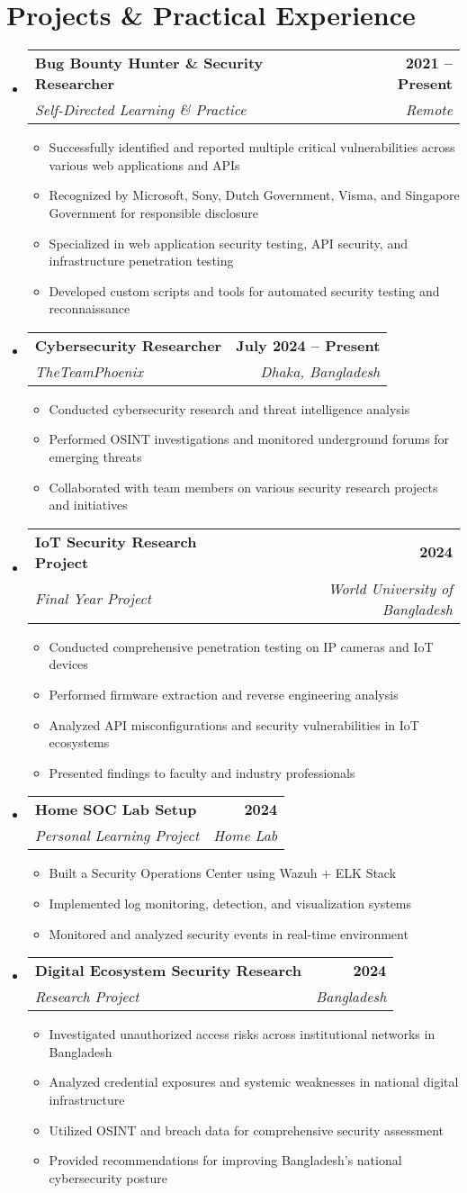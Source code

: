 \documentclass[11pt,a4paper]{article}
\makeatletter
\newcommand{\resumeitem}[1]{\item\small{#1}}
\newcommand{\resumesubheading}[4]{
  \vspace{-1pt}\item
    \begin{tabular*}{0.97\textwidth}[t]{l@{\extracolsep{\fill}}r}
      \textbf{#1} & \textbf{\small #2} \\
      \textit{\small#3} & \textit{\small #4} \\
    \end{tabular*}\vspace{-5pt}
}
\newcommand{\resumesubheadingliststart}{\begin{itemize}[leftmargin=0.15in, label={}]}
\newcommand{\resumesubheadinglistend}{\end{itemize}}
\newcommand{\resumeitemliststart}{\begin{itemize}}
\newcommand{\resumeitemlistend}{\end{itemize}\vspace{-5pt}}
\makeatother
\begin{document}
\section{Projects \& Practical Experience}
\resumesubheadingliststart
\resumesubheading
{Bug Bounty Hunter \& Security Researcher}{2021 -- Present}
{Self-Directed Learning \& Practice}{Remote}
\resumeitemliststart
\resumeitem{Successfully identified and reported multiple critical vulnerabilities across various web applications and APIs}
\resumeitem{Recognized by Microsoft, Sony, Dutch Government, Visma, and Singapore Government for responsible disclosure}
\resumeitem{Specialized in web application security testing, API security, and infrastructure penetration testing}
\resumeitem{Developed custom scripts and tools for automated security testing and reconnaissance}
\resumeitemlistend

\resumesubheading
{Cybersecurity Researcher}{July 2024 -- Present}
{TheTeamPhoenix}{Dhaka, Bangladesh}
\resumeitemliststart
\resumeitem{Conducted cybersecurity research and threat intelligence analysis}
\resumeitem{Performed OSINT investigations and monitored underground forums for emerging threats}
\resumeitem{Collaborated with team members on various security research projects and initiatives}
\resumeitemlistend

\resumesubheading
{IoT Security Research Project}{2024}
{Final Year Project}{World University of Bangladesh}
\resumeitemliststart
\resumeitem{Conducted comprehensive penetration testing on IP cameras and IoT devices}
\resumeitem{Performed firmware extraction and reverse engineering analysis}
\resumeitem{Analyzed API misconfigurations and security vulnerabilities in IoT ecosystems}
\resumeitem{Presented findings to faculty and industry professionals}
\resumeitemlistend

\resumesubheading
{Home SOC Lab Setup}{2024}
{Personal Learning Project}{Home Lab}
\resumeitemliststart
\resumeitem{Built a Security Operations Center using Wazuh + ELK Stack}
\resumeitem{Implemented log monitoring, detection, and visualization systems}
\resumeitem{Monitored and analyzed security events in real-time environment}
\resumeitemlistend

\resumesubheading
{Digital Ecosystem Security Research}{2024}
{Research Project}{Bangladesh}
\resumeitemliststart
\resumeitem{Investigated unauthorized access risks across institutional networks in Bangladesh}
\resumeitem{Analyzed credential exposures and systemic weaknesses in national digital infrastructure}
\resumeitem{Utilized OSINT and breach data for comprehensive security assessment}
\resumeitem{Provided recommendations for improving Bangladesh's national cybersecurity posture}
\resumeitemlistend
\resumesubheadinglistend
\end{document}
